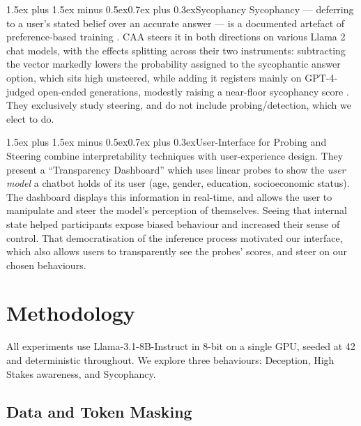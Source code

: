 \documentclass[conference]{IEEEtran}
\makeatletter
\renewcommand{\paragraph}{\@startsection{paragraph}{4}{2em}%
  {1.5ex plus 1.5ex minus 0.5ex}{0.7ex plus 0.3ex}{\normalfont\normalsize\itshape}}
\makeatother
\begin{document}
\paragraph{Sycophancy}
Sycophancy --- deferring to a user's stated belief over an accurate answer ---
is a documented artefact of preference-based training
\citep{perez2023,sharma2023}. CAA steers it in both directions on various
Llama 2 chat models, with the effects splitting across their two instruments:
subtracting the vector markedly lowers the probability assigned to the
sycophantic answer option, which sits high unsteered, while adding it registers
mainly on GPT-4-judged open-ended generations, modestly raising a near-floor
sycophancy score \citep{rimsky2024}. They exclusively study steering, and do
not include probing/detection, which we elect to do.

\paragraph{User-Interface for Probing and Steering}
\citet{chen2024} combine interpretability techniques with user-experience
design. They present a ``Transparency Dashboard'' which uses linear probes to
show the \emph{user model} a chatbot holds of its user (age, gender, education,
socioeconomic status). The dashboard displays this information in real-time,
and allows the user to manipulate and steer the model's perception of
themselves. Seeing that internal state helped participants expose biased
behaviour and increased their sense of control. That democratisation of the
inference process motivated our interface, which also allows users to
transparently see the probes' scores, and steer on our chosen behaviours.


\section{Methodology}
\label{sec:methodology}

All experiments use Llama-3.1-8B-Instruct in 8-bit on a single GPU, seeded at
42 and deterministic throughout. We explore three behaviours: Deception, High
Stakes awareness, and Sycophancy.

\subsection{Data and Token Masking}
\label{sec:masking}
\end{document}
